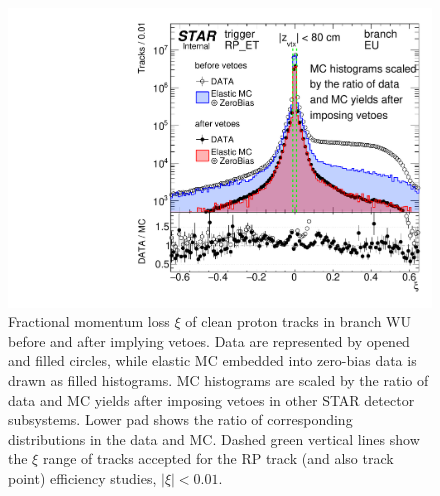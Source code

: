 \begin{figure}%
	\centering
	\parbox{0.4725\textwidth}{%
		\centering%
		\includegraphics[width=\linewidth,page=3]{graphics/systematicsEfficiency/RpSyst/xiPerBranch.pdf}%
	} 
	\quad
	\parbox{0.4725\textwidth}{ 
		\centering\vspace{67pt}
			\caption[Fractional momentum loss $\xi$ of clean proton tracks before and after implying vetoes in the data and MC (branch WU).]%
			{Fractional momentum loss $\xi$ of clean proton tracks in branch WU before and after implying vetoes. Data are represented by opened and filled circles, while elastic MC embedded into zero-bias data is drawn as filled histograms. MC histograms are scaled by the ratio of data and MC yields after imposing vetoes in other STAR detector subsystems. Lower pad shows the ratio of corresponding distributions in the data and MC. Dashed green vertical lines show the $\xi$ range of tracks accepted for the RP track (and also track point) efficiency studies, $|\xi|<0.01$.}\label{fig:rpSystXi_WU}%
	}
	
\end{figure}





